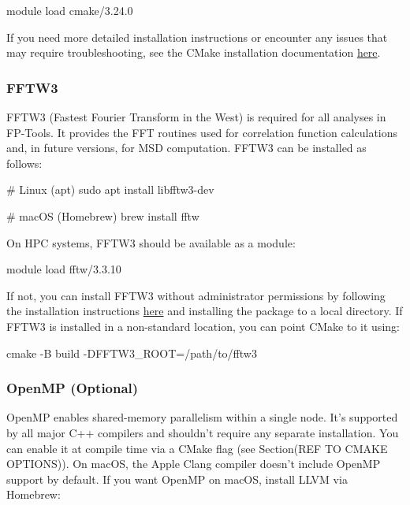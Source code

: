 \begin{bashcode}
module load cmake/3.24.0
\end{bashcode}

If you need more detailed installation instructions or encounter any issues that
may require troubleshooting, see the CMake installation documentation 
\href{https://cmake.org/download/}{here}.

\subsubsection{FFTW3}

FFTW3 (Fastest Fourier Transform in the West) is required for all analyses in
FP-Tools. It provides the FFT routines used for correlation function
calculations and, in future versions, for MSD computation. FFTW3 can be
installed as follows:

\begin{bashcode}
# Linux (apt)
sudo apt install libfftw3-dev

# macOS (Homebrew)
brew install fftw
\end{bashcode}

On HPC systems, FFTW3 should be available as a module:

\begin{bashcode}
module load fftw/3.3.10
\end{bashcode}

If not, you can install FFTW3 without administrator permissions by following the
installation instructions \href{https://www.fftw.org/fftw2_doc/fftw_6.html}{here}
and installing the package to a local directory. If FFTW3 is installed in a
non-standard location, you can point CMake to it using:

\begin{bashcode}
cmake -B build -DFFTW3_ROOT=/path/to/fftw3
\end{bashcode}


\subsubsection{OpenMP (Optional)}

OpenMP enables shared-memory parallelism within a single node. It's supported by
all major C++ compilers and shouldn't require any separate installation. You can
enable it at compile time via a CMake flag (see Section(REF TO CMAKE OPTIONS)). 
On macOS, the Apple Clang compiler doesn't include OpenMP support by default. If
you want OpenMP on macOS, install LLVM via Homebrew:

